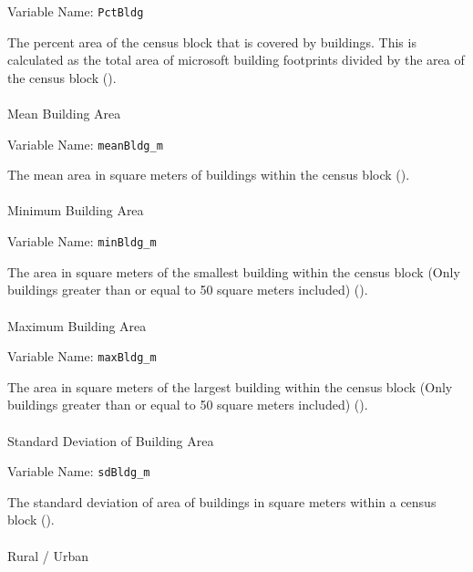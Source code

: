 \documentclass[12pt]{article}
\makeatletter
\let\oldparagraph\paragraph
\renewcommand{\paragraph}{
    \@ifstar
      \xxxParagraphStar
      \xxxParagraphNoStar
  }
\newcommand{\xxxParagraphStar}[1]{\oldparagraph*{#1}\mbox{}}
\newcommand{\xxxParagraphNoStar}[1]{\oldparagraph{#1}\mbox{}}
\makeatother
\begin{document}
Variable Name: \texttt{PctBldg}

The percent area of the census block that is covered by buildings. This
is calculated as the total area of microsoft building footprints divided
by the area of the census block ().

\paragraph{Mean Building Area}\label{mean-building-area}

Variable Name: \texttt{meanBldg\_m}

The mean area in square meters of buildings within the census block
().

\paragraph{Minimum Building Area}\label{minimum-building-area}

Variable Name: \texttt{minBldg\_m}

The area in square meters of the smallest building within the census
block (Only buildings greater than or equal to 50 square meters
included) ().

\paragraph{Maximum Building Area}\label{maximum-building-area}

Variable Name: \texttt{maxBldg\_m}

The area in square meters of the largest building within the census
block (Only buildings greater than or equal to 50 square meters
included) ().

\paragraph{Standard Deviation of Building
Area}\label{standard-deviation-of-building-area}

Variable Name: \texttt{sdBldg\_m}

The standard deviation of area of buildings in square meters within a
census block ().

\paragraph{Rural / Urban}\label{rural-urban}
\end{document}
